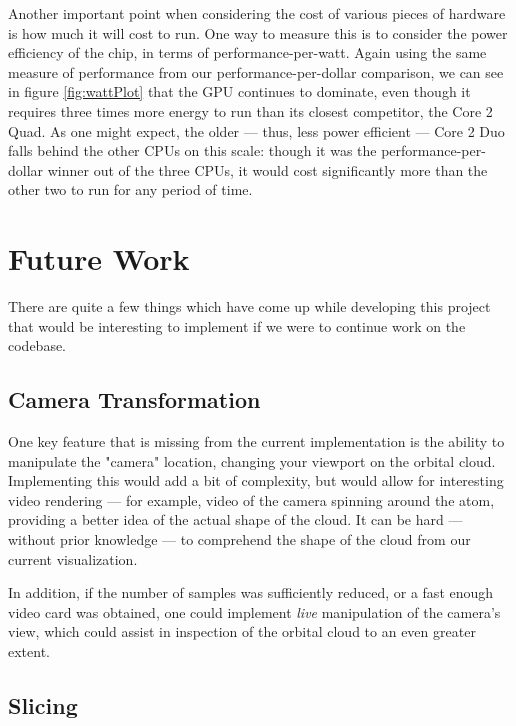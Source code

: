 \documentclass{acmsiggraph}
\begin{document}
Another important point when considering the cost of various pieces of hardware is how much it will cost to run. One way to measure this is to consider the power efficiency of the chip, in terms of performance-per-watt. Again using the same measure of performance from our performance-per-dollar comparison, we can see in figure \ref{fig:wattPlot} that the GPU continues to dominate, even though it requires three times more energy to run than its closest competitor, the Core 2 Quad. As one might expect, the older --- thus, less power efficient --- Core 2 Duo falls behind the other CPUs on this scale: though it was the performance-per-dollar winner out of the three CPUs, it would cost significantly more than the other two to run for any period of time.

\section{Future Work}

There are quite a few things which have come up while developing this project that would be interesting to implement if we were to continue work on the codebase.

\subsection{Camera Transformation}

\label{cameraTransformation}

One key feature that is missing from the current implementation is the ability to manipulate the "camera" location, changing your viewport on the orbital cloud. Implementing this would add a bit of complexity, but would allow for interesting video rendering --- for example, video of the camera spinning around the atom, providing a better idea of the actual shape of the cloud. It can be hard --- without prior knowledge --- to comprehend the shape of the cloud from our current visualization.

In addition, if the number of samples was sufficiently reduced, or a fast enough video card was obtained, one could implement {\it live} manipulation of the camera's view, which could assist in inspection of the orbital cloud to an even greater extent.

\subsection{Slicing}
\end{document}
